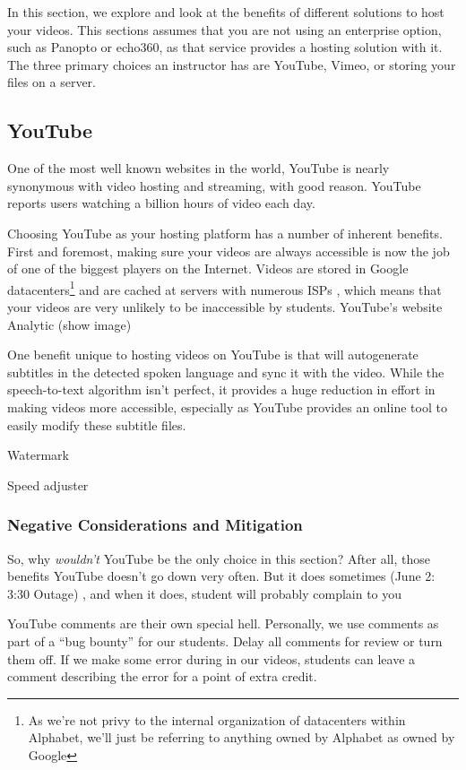 \documentclass[sigconf]{acmart}
\begin{document}
In this section, we explore and look at the benefits of different solutions to host your videos.  
This sections assumes that you are not using an enterprise option, such as Panopto or echo360, as that service provides a hosting solution with it.
The three primary choices an instructor has are YouTube, Vimeo, or storing your files on a server.

\subsection{YouTube}
One of the most well known websites in the world, YouTube is nearly synonymous with video hosting and streaming, with good reason.
YouTube reports users watching a billion hours of video each day.\cite{ytstats}


Choosing YouTube as your hosting platform has a number of inherent benefits.
First and foremost, making sure your videos are always accessible is now the job of one of the biggest players on the Internet.
Videos are stored in Google datacenters\footnote{As we're not privy to the internal organization of datacenters within Alphabet, we'll just be referring to anything owned by Alphabet as owned by Google} and are cached at servers with numerous ISPs \cite{peering}, which means that your videos are very unlikely to be inaccessible by students. 
YouTube's website
Analytic  (show image)


One benefit unique to hosting videos on YouTube is that will autogenerate subtitles in the detected spoken language \cite{liao2013large} and sync it with the video.  While the speech-to-text algorithm isn't perfect, it provides a huge reduction in effort in making videos more accessible, especially as YouTube provides an online tool to easily modify these subtitle files.


Watermark

Speed adjuster

\subsubsection{Negative Considerations and Mitigation}

So, why \textit{wouldn't} YouTube be the only choice in this section?
After all, those benefits  
YouTube doesn't go down very often.  
But it does sometimes \cite{outage2018} (June 2: 3:30 Outage) \cite{outage2019}, and when it does, student will probably complain to you 

YouTube comments are their own special hell.
Personally, we use comments as part of a ``bug bounty'' for our students.
Delay all comments for review or turn them off.
If we make some error during in our videos, students can leave a comment describing the error for a point of extra credit.
\end{document}
